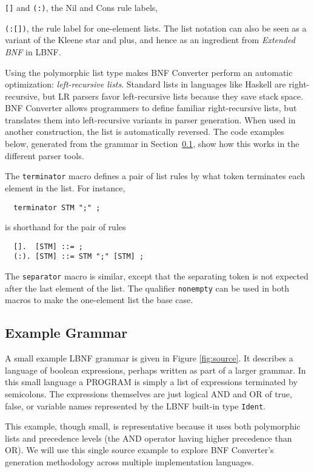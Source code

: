{\tt []} and {\tt (:)}, the Nil and Cons rule labels,

{\tt (:[])}, the rule label for one-element lists. 
\enqu
The list notation can also be seen as a variant of the 
Kleene star and plus, and hence as an ingredient from \textit{Extended BNF} in LBNF.

\label{leftrec}

Using the polymorphic list type makes BNF Converter perform
an automatic optimization: \textit{left-recursive lists}. 
Standard lists in
languages like Haskell are right-recursive, but
LR parsers favor left-recursive lists because they save 
stack space. 
BNF Converter allows programmers to define familiar 
right-recursive lists, but translates them into 
left-recursive variants in parser generation.
When used in another construction, the list is automatically 
reversed. The code examples below, generated from the grammar in
Section~\ref{example}, show how this works in the different parser tools.


\label{lists}

The {\tt terminator} macro defines a pair of list rules by what
token terminates each element in the list. For instance,
\begin{verbatim}
  terminator STM ";" ;
\end{verbatim}
is shorthand for the pair of rules
\begin{verbatim}
  [].  [STM] ::= ;
  (:). [STM] ::= STM ";" [STM] ;
\end{verbatim}
The {\tt separator} macro is similar,
except that the separating token is not expected after the last
element of the list. 
The qualifier {\tt nonempty} can be used in both macros to 
make the one-element list the base case. 


\subsection{Example Grammar}
\label{example}


A small example LBNF grammar is given in Figure \ref{fig:source}. It describes a language of boolean expressions, perhaps written as part of a larger grammar. In this small language a PROGRAM is simply a list of expressions terminated by semicolons. The expressions themselves are just logical AND and OR of true, false, or variable names represented by the LBNF built-in type \texttt{Ident}.

This example, though small, is representative because it uses both polymorphic lists and precedence levels (the AND operator having higher precedence than OR). We will use this single source example to explore BNF Converter's generation methodology across multiple implementation languages.


